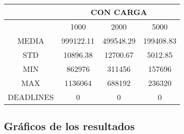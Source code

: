 \begin{center}
\begin{tabular}{|c|c|c|c|}
\hline
&\multicolumn{3}{|c|}{CON CARGA}\\
\hline
&1000&2000&5000\\
\hline
MEDIA&999122.11&499548.29&199408.83\\
\hline
STD&10896.38&12700.67&5012.85\\
\hline
MIN&862976&311456&157696\\
\hline
MAX&1136064&688192&236320\\
\hline
DEADLINES&0&0&0\\
\hline

\end{tabular}
\end{center}

\subsection{Gráficos de los resultados}

